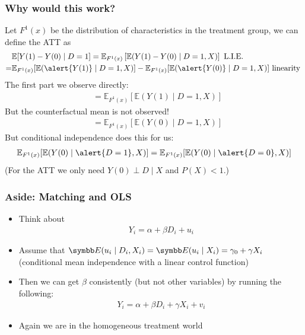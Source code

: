 \documentclass[aspectratio=169,11pt]{beamer}
\begin{document}
\begin{frame}
\frametitle{Why would this work?}
\small
Let  $F^{1}(x)$ be the distribution of characteristics in the treatment group, we can define the ATT as 
\begin{align*}
&\mathbb{E}[Y(1) - Y(0) \mid D =1] =\mathbb{E}_{F^1(x)} \left[\mathbb{E}(Y(1) -Y(0) \mid D=1,X) \right]  \text{ L.I.E. }\\
=&\mathbb{E}_{F^1(x)} [\mathbb{E}(\alert{Y(1)} \mid D=1,X)] -  \mathbb{E}_{F^1(x)} [\mathbb{E}(\alert{Y(0)} \mid D=1,X)] \text{ linearity } 
\end{align*}
The first part we observe directly:
\begin{align*}
&=\mathbb{E}_{F^1(x)} [\mathbb{E}(Y(1) \mid D=1,X)] 
\end{align*}
But the counterfactual mean is not observed!
\begin{align*}
&=\mathbb{E}_{F^1(x)} [\mathbb{E}(Y(0) \mid D=1,X)] 
\end{align*}
But conditional independence does this for us:
\begin{align*}
 \mathbb{E}_{F^1(x)} [\mathbb{E}(Y(0) \mid \alert{D=1},X)]  =  \mathbb{E}_{F^1(x)} [\mathbb{E}(Y(0) \mid \alert{D=0},X)] 
\end{align*}
(For the ATT we only need $Y(0) \perp D \mid X$ and $P(X)<1$.)
\end{frame}



\begin{frame}
\frametitle{Aside: Matching and OLS}
\begin{itemize}
\item Think about
\begin{eqnarray*}
Y_i  = \alpha + \beta D_i + u_i
\end{eqnarray*}
\item Assume that $\E(u_i \mid D_i,X_i) = \E(u_i \mid X_i) = \gamma_0 + \gamma X_i$ (conditional mean independence with a linear control function)
\item Then we can get $\beta$ consistently (but not other variables) by running the following:
\begin{eqnarray*}
Y_i = \alpha + \beta D_i + \gamma X_i + v_i
\end{eqnarray*}
\item Again we are in the homogeneous treatment world
\end{itemize}
\end{frame}
\end{document}
